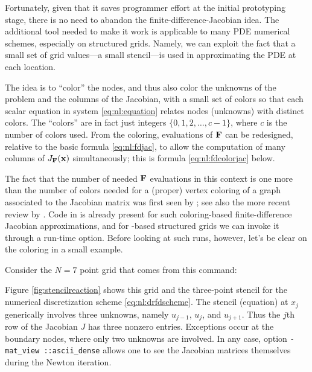 Fortunately, given that it saves programmer effort at the initial prototyping stage, there is no need to abandon the finite-difference-Jacobian idea.  The additional tool needed to make it work is applicable to many PDE numerical schemes, especially on structured grids.  Namely, we can exploit the fact that a small set of grid values---a small stencil---is used in approximating the PDE at each location.

The idea is to ``color'' the nodes, and thus also color the unknowns of the problem and the columns of the Jacobian, with a small set of colors so that each scalar equation in system \eqref{eq:nl:equation} relates nodes (unknowns) with distinct colors.  The ``colors'' are in fact just integers $\{0,1,2,\dots,c-1\}$, where $c$ is the number of colors used.  From the coloring, evaluations of $\mathbf{F}$ can be redesigned, relative to the basic formula \eqref{eq:nl:fdjac}, to allow the computation of many columns of $J_{\mathbf{F}}(\mathbf{x})$ simultaneously; this is formula \eqref{eq:nl:fdcolorjac} below.

The fact that the number of needed $\mathbf{F}$ evaluations in this context is one more than the number of colors needed for a (proper) vertex coloring \citep[e.g.~as defined in][]{ChartrandLesniakZhang2011} of a graph associated to the Jacobian matrix was first seen by \citet{ColemanMore1983}; see also the more recent review by \citet{Gebremedhinetal2005}.  Code in \PETSc is already present for such coloring-based finite-difference Jacobian approximations, and for \pDMDA-based structured grids we can invoke it through a run-time option.  Before looking at such runs, however, let's be clear on the coloring in a small example.

Consider the $N=7$ point grid that comes from this command:
Figure \ref{fig:stencilreaction} shows this grid and the three-point stencil for the numerical discretization scheme \eqref{eq:nl:drfdscheme}.  The stencil (equation) at $x_j$ generically involves three unknowns, namely $u_{j-1}$, $u_j$, and $u_{j+1}$.  Thus the $j$th row of the Jacobian $J$ has three nonzero entries.  Exceptions occur at the boundary nodes, where only two unknowns are involved.  In any case, option \texttt{-mat\_view ::ascii\_dense} allows one to see the Jacobian matrices themselves during the Newton iteration.

